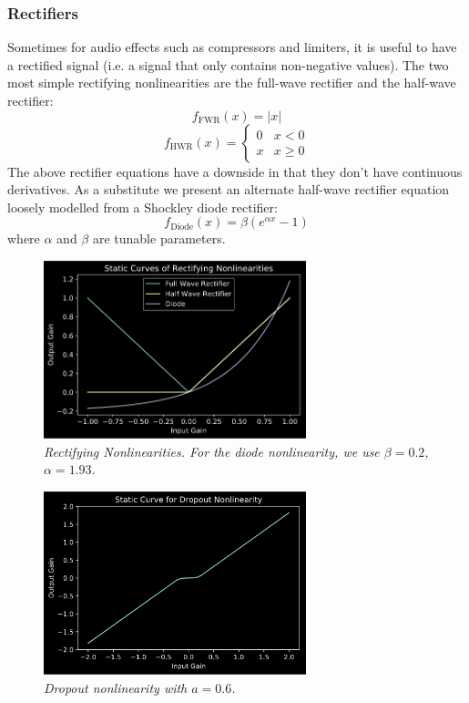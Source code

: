 \documentclass[twoside,a4paper]{article}
\begin{document}
\subsubsection{Rectifiers} \label{sec:rect}
%
Sometimes for audio effects such as compressors and limiters, it is
useful to have a rectified signal (i.e. a signal that only contains
non-negative values). The two most simple rectifying nonlinearities
are the full-wave rectifier and the half-wave rectifier:
%
\begin{equation}
    f_{\text{FWR}}(x) = |x|
    \label{eq:fwr}
\end{equation}
%
\begin{equation}
    f_{\text{HWR}}(x) = \begin{cases}
        0& x < 0 \\
        x& x \geq 0
    \end{cases}
    \label{eq:hwr}
\end{equation}
%
The above rectifier equations have a downside in that they don't have
continuous derivatives. As a substitute we present an alternate
half-wave rectifier equation loosely modelled from a Shockley diode
rectifier:
\begin{equation}
    f_{\text{Diode}}(x) = \beta \left(e^{\alpha x} - 1 \right)
    \label{eq:diode}
\end{equation}
%
where $\alpha$ and $\beta$ are tunable parameters.
%
\begin{figure}[h]
    \center
    \includegraphics[width=3in]{../Exciter/Pics/rect_static.png}
    \caption{\label{Rects}{\it Rectifying Nonlinearities. For the diode nonlinearity,
    we use $\beta = 0.2$, $\alpha = 1.93$.}}
\end{figure}
%
\begin{figure}[h]
    \center
    \includegraphics[width=3in]{Pics/dropout.png}
    \caption{\label{Drops}{\it Dropout nonlinearity with $a = 0.6$.}}
\end{figure}
%
\end{document}
